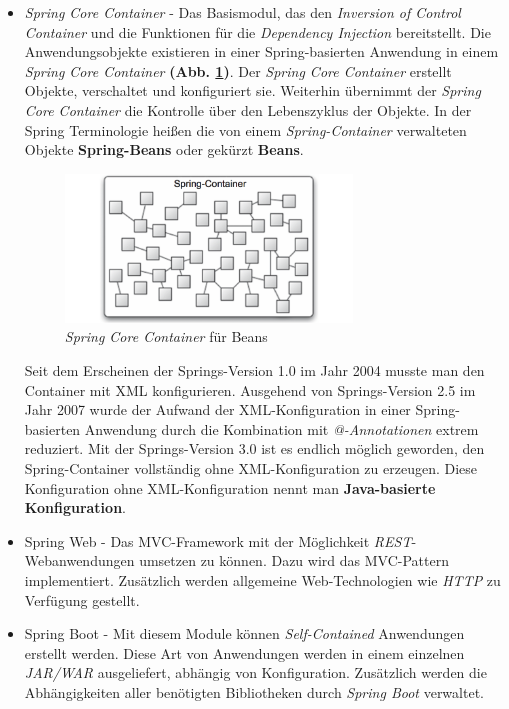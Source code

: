 \begin{itemize}
	\item \textit{Spring Core Container} - Das Basismodul, das den \textit{Inversion of Control Container} \cite{InAndOutOfControl} und die Funktionen für die \textit{Dependency Injection} \cite{DIinSpring} bereitstellt. Die Anwendungsobjekte existieren in einer Spring-basierten Anwendung in einem \textit{Spring Core Container} \textbf{(Abb. \ref{img:container})}. Der \textit{Spring Core Container} erstellt Objekte, verschaltet und konfiguriert sie. Weiterhin übernimmt der \textit{Spring Core Container} die Kontrolle über den Lebenszyklus der Objekte. In der Spring Terminologie heißen die von einem \textit{Spring-Container} verwalteten Objekte \textbf{Spring-Beans} oder gekürzt \textbf{Beans}.

\begin{figure}[H]
\centering
\includegraphics[width=3.0in]{resources/container}
\caption[\textit{Spring Core Container} für Beans]{\textit{Spring Core Container} für Beans}
\label{img:container}
\end{figure}

Seit dem Erscheinen der Springs-Version 1.0 im Jahr 2004 musste man den Container mit XML konfigurieren. Ausgehend von Springs-Version 2.5 im Jahr 2007 wurde der Aufwand der XML-Konfiguration in einer Spring-basierten Anwendung durch die Kombination mit \textit{@-Annotationen} extrem reduziert. Mit der Springs-Version 3.0 ist es endlich möglich geworden, den Spring-Container vollständig ohne XML-Konfiguration zu erzeugen. Diese Konfiguration ohne XML-Konfiguration nennt man \textbf{Java-basierte Konfiguration}.

	\item Spring Web - Das MVC-Framework mit der Möglichkeit \textit{REST}-Webanwendungen umsetzen zu können. Dazu wird das MVC-Pattern implementiert. Zusätzlich werden allgemeine Web-Technologien wie \textit{HTTP} zu Verfügung gestellt.
	\item Spring Boot - Mit diesem Module können \textit{Self-Contained} Anwendungen erstellt werden. Diese Art von Anwendungen werden in einem einzelnen \textit{JAR/WAR} ausgeliefert, abhängig von Konfiguration. Zusätzlich werden die Abhängigkeiten aller benötigten Bibliotheken durch \textit{Spring Boot} verwaltet. \cite{spring}
	\end{itemize}

